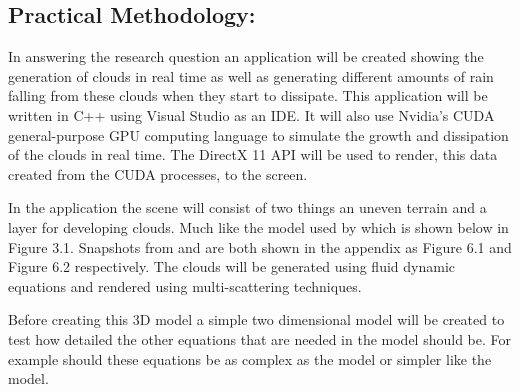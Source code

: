 \subsection{Practical Methodology:}
In answering the research question an application will be created showing the generation of clouds in real time as well as generating different amounts of rain falling from these clouds when they start to dissipate.
This application will be written in C++ using Visual Studio as an IDE.
It will also use Nvidia’s CUDA general-purpose GPU computing language to simulate the growth and dissipation of the clouds in real time.
The DirectX 11 API will be used to render, this data created from the CUDA processes, to the screen. 

In the application the scene will consist of two things an uneven terrain and a layer for developing clouds.
Much like the model used by \citet{DobashiEtAl00} which is shown below in Figure 3.1.
Snapshots from \citet{HarrisEtAl03} and \citet{Miyazaki01} are both shown in the appendix as Figure 6.1 and Figure 6.2 respectively.
The clouds will be generated using fluid dynamic equations and rendered using multi-scattering techniques.

Before creating this 3D model a simple two dimensional model will be created to test how detailed the other equations that are needed in the model should be.
For example should these equations be as complex as the \citet{HarrisEtAl03} model or simpler like the \citet*{Fedkiw01} model.